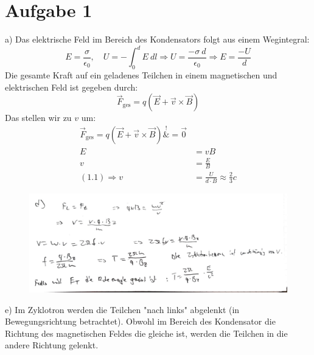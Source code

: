 \documentclass[11pt a4paper]{article}
\newcommand{\epsz}{\epsilon_0}
\begin{document}
\thispagestyle{fancy}
\section*{Aufgabe 1}
a) Das elektrische Feld im Bereich des Kondensators folgt aus einem 
Wegintegral:
\[
	E = \frac{\sigma}{\epsz}, \quad U = - \int_0^d E \ dl
	\Rightarrow
	U = \frac{-\sigma \ d}{\epsz} \Rightarrow
	E = \frac{-U}{d} \tag{1.1}
\]
Die gesamte Kraft auf ein geladenes Teilchen in einem magnetischen 
und elektrischen Feld ist gegeben durch:
\[ \vec F_\text{ges} = q (\vec E + \vec v \times \vec B) \]
Das stellen wir zu $v$ um:
\begin{align*}
	\vec F_\text{ges} = q (\vec E + \vec v \times \vec B) 
	\overset{!}&{=} \vec 0 \\
	E &= vB \\
	v &= \frac{E}{B} \\
	(1.1) \Rightarrow v &= \frac{U}{d \cdot B} 
	\approx \frac23 c
\end{align*}

\begin{figure}[H]
	\centering
	\includegraphics[width=15cm]{1d.jpg}
\end{figure}

\vspace{0.5cm}
e) Im Zyklotron werden die Teilchen "nach links" abgelenkt (in 
Bewegungsrichtung betrachtet). Obwohl im Bereich des Kondensator die 
Richtung des magnetischen Feldes die gleiche ist, werden die Teilchen in 
die andere Richtung gelenkt.

\newpage
\setlength{\headheight}{0cm}
\end{document}
